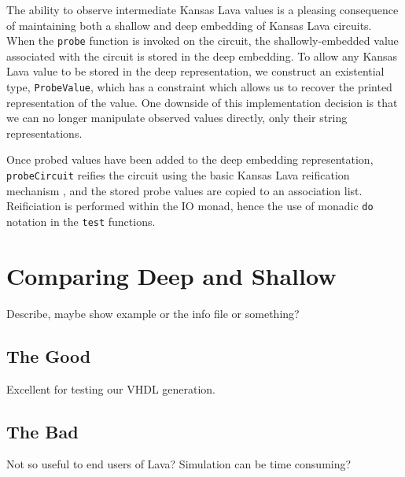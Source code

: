 \documentclass{llncs}
\begin{document}
The ability to observe intermediate Kansas Lava values is a pleasing consequence
of maintaining both a shallow and deep embedding of Kansas Lava
circuits. When the \verb!probe! function is invoked on the circuit, the
shallowly-embedded value associated with the circuit is stored in the deep
embedding. To allow any Kansas Lava value to be stored in the deep
representation, we construct an existential type, \verb!ProbeValue!, which has a
constraint which allows us to recover the printed representation of the
value. One downside of this implementation decision is that we can no longer
manipulate observed values directly, only their string representations.

Once probed values have been added to the deep embedding representation, 
\verb!probeCircuit! reifies the circuit using the basic Kansas Lava reification
mechanism \cite{}, and the stored probe values are copied to an association
list. Reificiation is performed within the IO monad, hence the use of monadic \verb!do!
notation in the \verb!test! functions.


\section{Comparing Deep and Shallow}

Describe, maybe show example or the info file or something?

\subsection{The Good}

Excellent for testing our VHDL generation.

\subsection{The Bad}

Not so useful to end users of Lava? Simulation can be time consuming?

\end{document}
